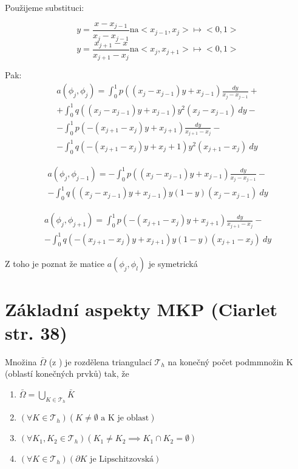 \documentclass[../main.tex]{subfiles}
\begin{document}
\begin{example}[MKP v 1D]
Použijeme substituci: 

\begin{equation}
    y = \frac{x - x_{j-1}}{x_j - x_{j-1}} \text{na} <x_{j-1}, x_j> \mapsto <0,1>
\end{equation}
\begin{equation}
    y = \frac{x_{j+1} - x}{x_{j+1} - x_{j}} \text{na} <x_{j}, x_{j+1}> \mapsto <0,1>
\end{equation}

Pak: 
\begin{multline}
    a(\phi_j, \phi_j) = \int_0^1 p((x_j - x_{j-1})y + x_{j-1}) \frac{dy}{x_j - x_{j-1}} +\\+ \int_0^1 q((x_j - x_{j-1})y + x_{j-1}) y^2 (x_j - x_{j-1}) \ dy -\\- \int_0^1 p(-(x_{j+1} - x_j)y + x_{j+1}) \frac{dy}{ x_{j+1} - x_j} -\\- \int_0^1 q(-(x_{j+1} - x_j)y + x_j+1) y^2 (x_{j+1} - x_j) \ dy
\end{multline}

\begin{multline}
    a(\phi_j, \phi_{j-1}) = - \int_0^1 p((x_j - x_{j-1})y + x_{j-1}) \frac{dy}{x_j - x_{j-1}} -\\- \int_0^1 q((x_j - x_{j-1})y + x_{j-1}) y(1-y) (x_j - x_{j-1}) \ dy
\end{multline}

\begin{multline}
    a(\phi_j, \phi_{j+1}) = \int_0^1 p(-(x_{j+1} - x_j)y + x_{j+1}) \frac{dy}{ x_{j+1} - x_j} -\\- \int_0^1 q(-(x_{j+1} - x_j)y + x_{j+1}) y(1-y) (x_{j+1} - x_j) \ dy
\end{multline}

Z toho je poznat že matice $a(\phi_j, \phi_l)$ je symetrická
\end{example}

\section{Základní aspekty MKP (Ciarlet str. 38)}
\begin{theorem}[MKP1]
    Množina $\bar{\Omega}$ (z ) je rozdělena triangulací $\mathcal{T}_h$ na konečný počet podmmnožin K (oblastí konečných prvků) tak, že 
    \begin{enumerate}
        \item $\bar{\Omega} = \bigcup_{K\in\mathcal{T}_h} \bar{K}$
        \item $(\forall K  \in \mathcal{T}_h)(K\neq\emptyset \text{ a K je oblast})$
        \item $(\forall K_1, K_2 \in \mathcal{T}_h)(K_1 \neq K_2 \implies K_1 \cap K_2 = \emptyset)$
        \item $(\forall K \in \mathcal{T}_h) (\partial K \text{ je Lipschitzovská} )$
    \end{enumerate}
\end{theorem}
\end{document}
